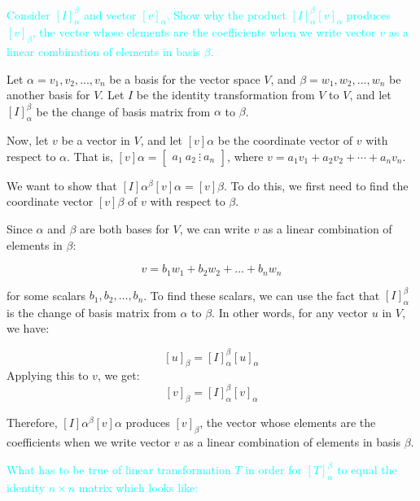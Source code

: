 \documentclass[fontsize=12pt]{scrartcl}
\begin{document}
\newpage

\noindent
\textcolor{cyan}{Consider $[I]_{\alpha}^{\beta}$ and vector $[v]_{\alpha}$. Show why the product $[I]_{\alpha}^{\beta}[v]_{\alpha}$ produces $[v]_{\beta}$, the vector whose elements are the coefficients when we write vector $v$ as a linear combination of elements in basis $\beta$.}

\noindent
Let $\alpha = {v_1, v_2, ..., v_n}$ be a basis for the vector space $V$, and $\beta = {w_1, w_2, ..., w_n}$ be another basis for $V$. Let $I$ be the identity transformation from $V$ to $V$, and let $[I]_{\alpha}^{\beta}$ be the change of basis matrix from $\alpha$ to $\beta$.

\noindent
Now, let $v$ be a vector in $V$, and let $[v]{\alpha}$ be the coordinate vector of $v$ with respect to $\alpha$. That is, $[v]{\alpha} = \begin{bmatrix} a_1 \ a_2 \ \vdots \ a_n \end{bmatrix}$, where $v = a_1 v_1 + a_2 v_2 + \cdots + a_n v_n$.

\noindent
We want to show that $[I]{\alpha}^{\beta}[v]{\alpha} = [v]{\beta}$. To do this, we first need to find the coordinate vector $[v]{\beta}$ of $v$ with respect to $\beta$.

\noindent
Since $\alpha$ and $\beta$ are both bases for $V$, we can write $v$ as a linear combination of elements in $\beta$:

$$v = b_1w_1 + b_2w_2 + \ldots + b_nw_n $$

\noindent
for some scalars $b_1, b_2, \dots, b_n$. To find these scalars, we can use the fact that $[I]_{\alpha}^{\beta}$ is the change of basis matrix from $\alpha$ to $\beta$. In other words, for any vector $u$ in $V$, we have:

$$[u]_{\beta} = [I]_{\alpha}^{\beta}[u]_{\alpha} $$
\noindent
Applying this to $v$, we get:
$$[v]_{\beta} = [I]_{\alpha}^{\beta}[v]_{\alpha} $$

\noindent
Therefore, $[I]{\alpha}^{\beta}[v]{\alpha}$ produces $[v]_{\beta}$, the vector whose elements are the coefficients when we write vector $v$ as a linear combination of elements in basis $\beta$.

\newpage


\noindent
\textcolor{cyan}{What has to be true of linear transformation $T$ in order for $[T]_{\alpha}^{\beta}$ to equal the identity $n \times n$ matrix which looks like:}
\end{document}
